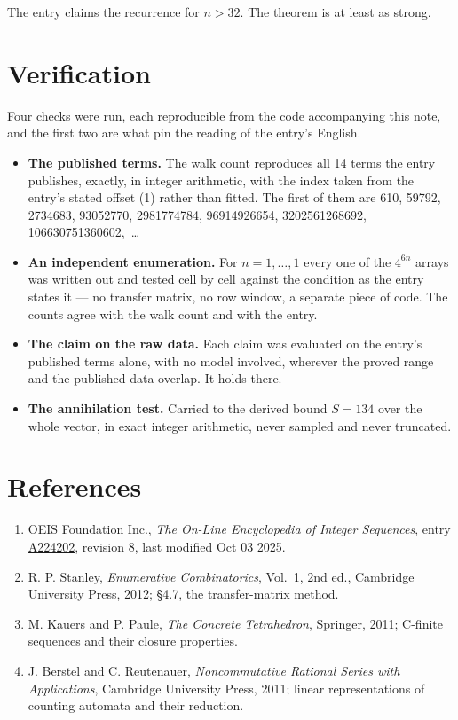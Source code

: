 \documentclass[11pt]{article}
\theoremstyle{definition}
\begin{document}
The entry claims the recurrence for $n > 32$. The theorem is at least as strong.

\section{Verification}

Four checks were run, each reproducible from the code accompanying this note, and the first two are what pin the reading of the entry's English.

\begin{itemize}

\item {\bfseries The published terms.} The walk count reproduces all 14 terms the entry publishes, exactly, in integer arithmetic, with the index taken from the entry's stated offset (1) rather than fitted. The first of them are 610, 59792, 2734683, 93052770, 2981774784, 96914926654, 3202561268692, 106630751360602,~\dots

\item {\bfseries An independent enumeration.} For $n = 1,\dots,1$ every one of the $4^{6n}$ arrays was written out and tested cell by cell against the condition as the entry states it --- no transfer matrix, no row window, a separate piece of code. The counts agree with the walk count and with the entry.

\item {\bfseries The claim on the raw data.} Each claim was evaluated on the entry's published terms alone, with no model involved, wherever the proved range and the published data overlap. It holds there.

\item {\bfseries The annihilation test.} Carried to the derived bound $S = 134$ over the whole vector, in exact integer arithmetic, never sampled and never truncated.

\end{itemize}

\section{References}

\begin{enumerate}

\item OEIS Foundation Inc., \emph{The On-Line Encyclopedia of Integer Sequences}, entry \href{https://oeis.org/A224202}{A224202}, revision 8, last modified Oct 03 2025.

\item R. P. Stanley, \emph{Enumerative Combinatorics}, Vol.~1, 2nd ed., Cambridge University Press, 2012; \S4.7, the transfer-matrix method.

\item M. Kauers and P. Paule, \emph{The Concrete Tetrahedron}, Springer, 2011; C-finite sequences and their closure properties.

\item J. Berstel and C. Reutenauer, \emph{Noncommutative Rational Series with Applications}, Cambridge University Press, 2011; linear representations of counting automata and their reduction.

\end{enumerate}
\end{document}

